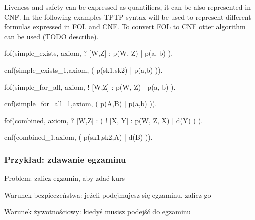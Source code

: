 Liveness and safety can be expressed as quantifiers, it can be also represented in \gls{CNF}.
In the following examples TPTP syntax will be used to represent different formulas expressed in \gls{FOL} and \gls{CNF}. To convert \gls{FOL} to \gls{CNF} otter algorithm can be used (TODO describe).

\begin{tptpcode}
fof(simple_exists, axiom,
 ? [W,Z] :  p(W, Z) | p(a, b)
  ).

cnf(simple_exists_1,axiom,
    ( p(sk1,sk2) | p(a,b) )).
\end{tptpcode}

\begin{tptpcode}
fof(simple_for_all, axiom,
 ! [W,Z] :  p(W, Z) | p(a, b)
  ).

cnf(simple_for_all_1,axiom,
    ( p(A,B) | p(a,b) )).
\end{tptpcode}


\begin{tptpcode}
fof(combined, axiom,
 ? [W,Z] : ( ! [X, Y] : p(W, Z, X)  | d(Y) )
  ).

cnf(combined_1,axiom,
    ( p(sk1,sk2,A) | d(B) )).
\end{tptpcode}

\subsubsection{Przykład: zdawanie egzaminu}

\noindent
Problem: zalicz egzamin, aby zdać kurs

\noindent
Warunek bezpieczeństwa: jeżeli podejmujesz się egzaminu, zalicz go

\noindent
Warunek żywotnościowy: kiedyś musisz podejść do egzaminu

